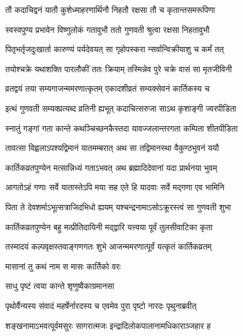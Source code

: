 \twolineshloka
{तौ कदाचिद्वनं यातौ कुशेध्माहरणार्थिनौ}
{निहतौ रक्षसा तौ च कृतान्तसमरूपिणा} %

\twolineshloka
{स्वस्वपुण्य प्रभावेन विष्णुलोकं गतावुभौ}
{ततो गुणवती श्रुत्वा रक्षसा निहतावुभौ} %

\twolineshloka
{पितृभर्तृजदुःखार्ता कारुण्यं पर्यदेवयत्}
{सा गृहोपस्करा न्सर्वान्विक्रीयाशु च कर्मं तत्} %

\twolineshloka
{तयोश्चक्रे यथाशक्ति पारलौकीं ततः क्रियाम्}
{तस्मिन्नेव पुरे चक्रे वासं सा मृतजीविनी} %

\twolineshloka
{व्रतद्वयं तया सम्यगाजन्ममरणात्कृतम्}
{एकादशीव्रतं सम्यक्सेवनं कार्तिकस्य च} %

\twolineshloka
{इत्थं गुणवती सम्यक्प्रत्यब्द व्रतिनी ह्यभूत्}
{कदाचित्सरुजा साऽथ कृशाङ्गी ज्वरपीडिता} %

\twolineshloka
{स्नातुं गङ्गां गता कान्ते कथञ्चिच्छनकैस्तदा}
{यावज्जलान्तरगता कम्पिता शीतपीडिता} %

\twolineshloka
{तावत्सा विह्वलाऽपश्यद्विमानं यातमम्बरात्}
{अथ सा तद्विमानस्था वैकुण्ठभुवनं ययौ} %

\twolineshloka
{कार्तिकव्रतपुण्येन मत्सान्निध्यं गताऽभवत्}
{अथ ब्रह्मादिदेवानां यदा प्रार्थनया भुवम्} %

\twolineshloka
{आगतोऽहं गणाः सर्वे यातास्तेऽपि मया सह}
{एते हि यादवाः सर्वे मद्गणा एव भामिनि} %

\twolineshloka
{पिता ते देवशर्माऽभूत्सत्राजिदभिधो ह्ययम्}
{यश्चन्द्रनामाऽसोऽक्रूरस्त्वं सा गुणवती शुभा} %

\twolineshloka
{कार्तिकव्रतपुण्येन बहु मत्प्रीतिदायिनी}
{मद्द्वारि यत्त्वया पूर्वं तुलसीवाटिका कृता} %

\twolineshloka
{तस्मादयं कल्पवृक्षस्तवाङ्गणगतः शुभे}
{आजन्ममरणात्पूर्वं यत्कृतं कार्तिकव्रतम्} %




\onelineshloka
{मासानां तु कथं नाम स मासः कार्तिको वरः} %




\onelineshloka
{साधु पृष्टं त्वया कान्ते शृणुष्वैकाग्रमानसा} %

\twolineshloka
{पृथोर्वैन्यस्य संवादं महर्षेर्नारदस्य च}
{एवमेव पुरा पृष्टो नारदः पृथुनाब्रवीत्} %


\twolineshloka
{शङ्खनामाऽभवत्पूर्वमसुरः सागरात्मजः}
{इन्द्रादिलोकपालानामधिकाराञ्जहार ह} %

